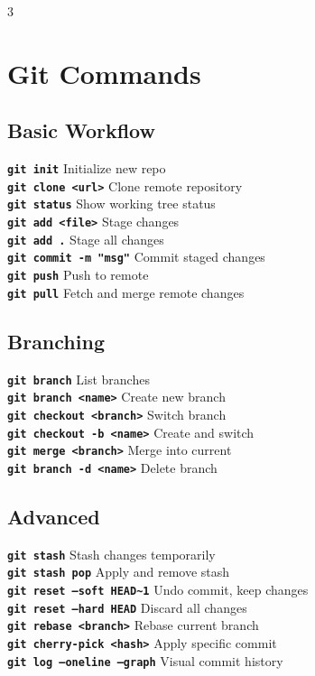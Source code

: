 \documentclass[7pt,landscape]{extarticle}
\newcommand{\cmd}[1]{\textcolor{csPrimary}{\texttt{\textbf{\fontsize{6pt}{7pt}\selectfont#1}}}}
\begin{document}
\begin{multicols*}{3}
\section*{Git Commands}

\subsection*{Basic Workflow}
\cmd{git init} \hfill Initialize new repo \\
\cmd{git clone <url>} \hfill Clone remote repository \\
\cmd{git status} \hfill Show working tree status \\
\cmd{git add <file>} \hfill Stage changes \\
\cmd{git add .} \hfill Stage all changes \\
\cmd{git commit -m "msg"} \hfill Commit staged changes \\
\cmd{git push} \hfill Push to remote \\
\cmd{git pull} \hfill Fetch and merge remote changes

\subsection*{Branching}
\cmd{git branch} \hfill List branches \\
\cmd{git branch <name>} \hfill Create new branch \\
\cmd{git checkout <branch>} \hfill Switch branch \\
\cmd{git checkout -b <name>} \hfill Create and switch \\
\cmd{git merge <branch>} \hfill Merge into current \\
\cmd{git branch -d <name>} \hfill Delete branch

\subsection*{Advanced}
\cmd{git stash} \hfill Stash changes temporarily \\
\cmd{git stash pop} \hfill Apply and remove stash \\
\cmd{git reset --soft HEAD\~{}1} \hfill Undo commit, keep changes \\
\cmd{git reset --hard HEAD} \hfill Discard all changes \\
\cmd{git rebase <branch>} \hfill Rebase current branch \\
\cmd{git cherry-pick <hash>} \hfill Apply specific commit \\
\cmd{git log --oneline --graph} \hfill Visual commit history


\end{multicols*}
\end{document}
